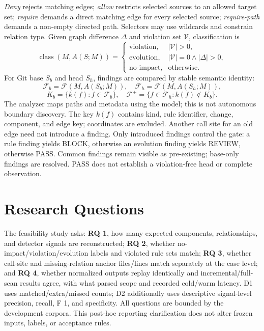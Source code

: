 \documentclass[conference]{IEEEtran}
\begin{document}
\emph{Deny} rejects matching edges; \emph{allow} restricts selected sources to an allowed target set; \emph{require} demands a direct matching edge for every selected source; \emph{require-path} demands a non-empty directed path. Selectors may use wildcards and constrain relation type. Given graph difference $\Delta$ and violation set $\mathcal V$, classification is
\[
\operatorname{class}(M,A(S;M))=
\begin{cases}
\text{violation},&|\mathcal V|>0,\\
\text{evolution},&|\mathcal V|=0\land|\Delta|>0,\\
\text{no-impact},&\text{otherwise.}
\end{cases}
\]
For Git base $S_b$ and head $S_h$, findings are compared by stable semantic identity:
\[
\mathcal F_b=\mathcal F(M,A(S_b;M)),\quad
\mathcal F_h=\mathcal F(M,A(S_h;M)),
\]
\[
K_b=\{k(f):f\in\mathcal F_b\},\quad
\mathcal F^+=\{f\in\mathcal F_h:k(f)\notin K_b\}.
\]
The analyzer maps paths and metadata using the model; this is not autonomous boundary discovery. The key $k(f)$ contains kind, rule identifier, change, component, and edge key; coordinates are excluded. Another call site for an old edge need not introduce a finding. Only introduced findings control the gate: a rule finding yields BLOCK, otherwise an evolution finding yields REVIEW, otherwise PASS. Common findings remain visible as pre-existing; base-only findings are resolved. PASS does not establish a violation-free head or complete observation.

\section{Research Questions}
The feasibility study asks: \textbf{RQ 1}, how many expected components, relationships, and detector signals are reconstructed; \textbf{RQ 2}, whether no-impact/violation/evolution labels and violated rule sets match; \textbf{RQ 3}, whether call-site and missing-relation anchor files/lines match separately at the case level; and \textbf{RQ 4}, whether normalized outputs replay identically and incremental/full-scan results agree, with what parsed scope and recorded cold/warm latency. D1 uses matched/extra/missed counts; D2 additionally uses descriptive signal-level precision, recall, F 1, and specificity. All questions are bounded by the development corpora. This post-hoc reporting clarification does not alter frozen inputs, labels, or acceptance rules.
\end{document}
